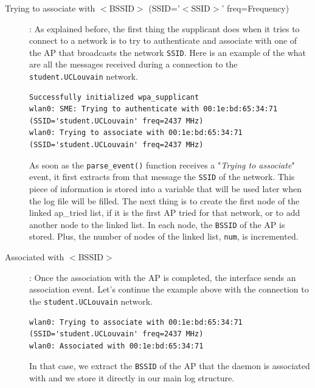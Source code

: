 \begin{description}
	\item[Trying to associate with $<$BSSID$>$ (SSID='$<$SSID$>$' freq=Frequency)]:
		As explained before, the first thing the supplicant does when it tries to connect to a network is to try to authenticate and associate with one of the AP that broadcasts the network \texttt{SSID}. Here is an example of the what are all the messages received during a connection to the \texttt{student.UCLouvain} network.\\

\begin{lstlisting}[frame=single,breaklines=true,caption={Example of a connection to the \texttt{student.UCLouvain} network - 1}]
Successfully initialized wpa_supplicant
wlan0: SME: Trying to authenticate with 00:1e:bd:65:34:71 (SSID='student.UCLouvain' freq=2437 MHz)
wlan0: Trying to associate with 00:1e:bd:65:34:71 (SSID='student.UCLouvain' freq=2437 MHz)
\end{lstlisting}

	As soon as the \texttt{parse\_event()} function receives a "\textit{Trying to associate}" event, it first extracts from that message the \texttt{SSID} of the network. This piece of information is stored into a variable that will be used later when the log file will be filled. The next thing is to create the first node of the linked ap\_tried list, if it is the first AP tried for that network, or to add another node to the linked list. In each node, the \texttt{BSSID} of the AP is stored. Plus, the number of nodes of the linked list, \texttt{num}, is incremented.

	\item[Associated with $<$BSSID$>$]:
	Once the association with the AP is completed, the interface sends an association event. Let's continue the example above with the connection to the \texttt{student.UCLouvain} network.\\

\begin{lstlisting}[frame=single,breaklines=true,caption={Example of a connection to the \texttt{student.UCLouvain} network - 2}]
wlan0: Trying to associate with 00:1e:bd:65:34:71 (SSID='student.UCLouvain' freq=2437 MHz)
wlan0: Associated with 00:1e:bd:65:34:71
\end{lstlisting}

	In that case, we extract the \texttt{BSSID} of the AP that the daemon is associated with and we store it directly in our main log structure.


\end{description}
